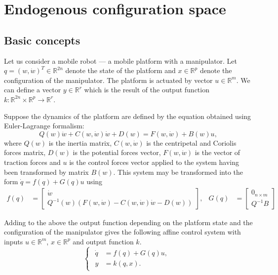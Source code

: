 \chapter{Endogenous configuration space}
\label{ch:endogen}
\section{Basic concepts}
Let us consider a mobile robot --- a mobile platform with a manipulator. Let $q = (w, \dot w)^T \in \mathbb{R}^{2n}$ denote the state of the platform and $x \in \mathbb{R}^p$ denote the configuration of the manipulator. The platform is actuated by vector $u \in \mathbb{R}^m$. We can define a vector $y \in \mathbb{R}^r$ which is the result of the output function $k: \mathbb{R}^{2n} \times \mathbb{R}^p \rightarrow \mathbb{R}^r$. 

Suppose the dynamics of the platform are defined by the equation obtained using Euler-Lagrange formalism:
\begin{equation}
Q(w)\ddot w + C(w, \dot{w})\dot{w}+D(w)=F(w, \dot w)+B(w)u,
\end{equation}
where $Q(w)$ is the inertia matrix, $C(w, \dot w)$ is the centripetal and Coriolis forces matrix,
$D(w)$ is the potential forces vector, $F(w, \dot w)$ is the vector of traction forces and $u$ is the
control forces vector applied to the system having been transformed by matrix $B(w)$.
This system may be transformed into the form $\dot q = f(q) + G(q)u$ using
\begin{equation}
\begin{aligned}
f(q)&=\begin{bmatrix}
\dot{w}\\
Q^{-1}(w)\left(F(w, \dot w)-C(w, \dot{w})\dot{w}-D(w)\right)
\end{bmatrix}, & G(q)&=\begin{bmatrix}
0_{n\times m}\\
Q^{-1}B
\end{bmatrix}
\end{aligned}
\end{equation}

Adding to the above the output function depending on the platform state and the configuration of the manipulator gives the following affine control system with inputs
$u \in \mathbb{R}^m$, $x \in \mathbb{R}^p$ and output function $k$.
\begin{equation}
\begin{cases}
\begin{aligned}
\label{eq:control_sys}
\dot q &= f(q) + G(q)u,\\
y &= k(q, x).
\end{aligned}
\end{cases}
\end{equation}

